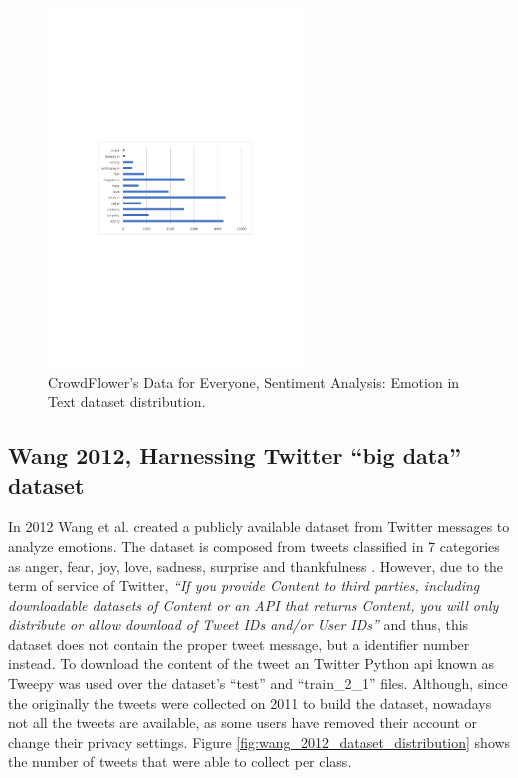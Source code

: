 \begin{figure}[!htp]
  \center
  \includegraphics[width=0.6\textwidth]{figures/crowd_flower_dataset_distribution}
  \caption{CrowdFlower's Data for Everyone, Sentiment Analysis: Emotion in Text dataset distribution.}
  \label{fig:crowdflower_dataset_distribution}
\end{figure}

\FloatBarrier

\subsection{Wang 2012, Harnessing Twitter ``big data'' dataset}

In 2012 Wang et al. created a publicly available dataset from Twitter messages to analyze emotions. The dataset is composed from tweets classified in 7 categories as anger, fear, joy, love, sadness, surprise and thankfulness \cite{wang2012harnessing}. However, due to the term of service of Twitter, \textit{``If you provide Content to third parties, including downloadable datasets of Content or an API that returns Content, you will only distribute or allow download of Tweet IDs and/or User IDs''} \cite{twitterTOS} and thus, this dataset does not contain the proper tweet message, but a identifier number instead. To download the content of the tweet an Twitter Python \acrshort{api} known as Tweepy \cite{Tweepy} was used over the dataset's ``test'' and ``train\_2\_1'' files. Although, since the originally the tweets were collected on 2011 to build the dataset, nowadays not all the tweets are available, as some users have removed their account or change their privacy settings. Figure \ref{fig:wang_2012_dataset_distribution} shows the number of tweets that were able to collect per class.

